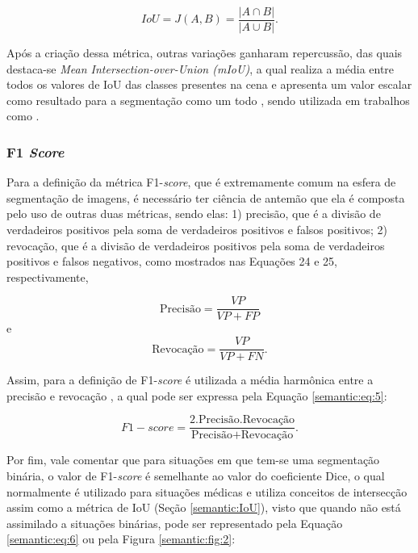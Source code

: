 \begin{equation}
    \label{semantic:eq:2}
    IoU = J(A,B) = \frac{|A \cap B|}{|A \cup B|}.
\end{equation}

Após a criação dessa métrica, outras variações ganharam repercussão, das quais destaca-se \textit{Mean Intersection-over-Union (mIoU)}, a qual realiza a média entre todos os valores de IoU das classes presentes na cena e apresenta um valor escalar como resultado para a segmentação como um todo \cite{Minaee2021}, sendo utilizada em trabalhos como \cite{Mohan2020}.


\subsubsection{F1 \textit{Score}}
\label{semantic:f1}

Para a definição da métrica F1-\textit{score}, que é extremamente comum na esfera de segmentação de imagens, é necessário ter ciência de antemão que ela é composta pelo uso de outras duas métricas, sendo elas: 1) precisão, que é a divisão de verdadeiros positivos pela soma de verdadeiros positivos e falsos positivos; 2) revocação, que é a divisão de verdadeiros positivos pela soma de verdadeiros positivos e falsos negativos, como mostrados nas Equações 24 e 25, respectivamente,

\begin{equation}
    \label{semantic:eq:3}
    \text{Precisão} = \frac{VP}{VP + FP}
\end{equation}
e
\begin{equation}
    \label{semantic:eq:4}
    \text{Revocação} = \frac{VP}{VP + FN}.
\end{equation}

Assim, para a definição de F1-\textit{score} é utilizada a média harmônica entre a precisão e revocação \cite{Minaee2021}, a qual pode ser expressa pela Equação \ref{semantic:eq:5}:

\begin{equation}
    \label{semantic:eq:5}
    F1-score = \frac{2 . \text{Precisão} . \text{Revocação}}{\text{Precisão} + \text{Revocação}}.
\end{equation}

Por fim, vale comentar que para situações em que tem-se uma segmentação binária, o valor de F1-\textit{score} é semelhante ao valor do coeficiente Dice, o qual normalmente é utilizado para situações médicas \cite{Minaee2021} e utiliza conceitos de intersecção assim como a métrica de IoU (Seção \ref{semantic:IoU}), visto que quando não está assimilado a situações binárias, pode ser representado pela Equação \ref{semantic:eq:6} ou pela Figura \ref{semantic:fig:2}:

